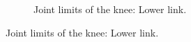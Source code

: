 \begin{figure}[ht!]
\begin{subfigure}[b]{0.49\textwidth}
        \caption{Joint limits of the knee: Lower link.}
        \label{fig:joint_limits_knee_lower}
    \end{subfigure}
\end{figure}    

